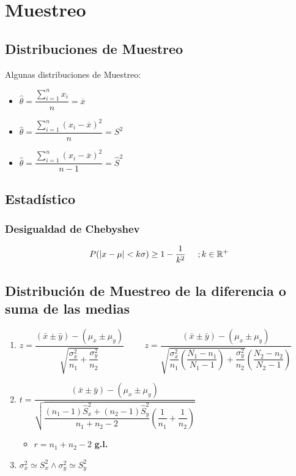 \documentclass[10pt,letterpaper]{article}
\begin{document}
\section{Muestreo}
\subsection{Distribuciones de Muestreo}
Algunas distribuciones de Muestreo:
\begin{multicols}{3}
\begin{itemize}
\item $\widehat{\theta}=\dfrac{\displaystyle\sum_{i=1}^{n} x_i}{n}=\overline{x}$
\end{itemize}
\columnbreak
\begin{itemize}
\item $\widehat{\theta}=\dfrac{\displaystyle\sum_{i=1}^{n} (x_i-\overline{x})^2}{n}=S^2$
\end{itemize}
\columnbreak
\begin{itemize}
\item $\widehat{\theta}=\dfrac{\displaystyle\sum_{i=1}^{n} (x_i-\overline{x})^2}{n-1}=\widehat{S}^2$
\end{itemize}
\end{multicols}
\subsection{Estadístico}
\subsubsection{Desigualdad de Chebyshev}
$$
P(|x-\mu|<k\sigma) \geq 1-\dfrac{1}{k^2} \hspace{0.5cm};k\in \mathbb{R^+}
$$
\subsection{Distribución de Muestreo de la diferencia o suma de las medias}
\begin{enumerate}[label=\Roman*)]
  \item $z=\dfrac{(\bar{x}\pm\bar{y})-(\mu_x\pm\mu_y)}{\sqrt{\dfrac{\sigma_{x}^2}{n_1}+\dfrac{\sigma_{y}^2}{n_2}}}\hspace{1cm}
  z=\dfrac{(\bar{x}\pm\bar{y})-(\mu_x\pm\mu_y)}{\sqrt{\dfrac{\sigma_{x}^2}{n_1}\left(\dfrac{N_1-n_1}{N_1 - 1}\right)  +\dfrac{\sigma_{y}^2}{n_2}}\left(\dfrac{N_2-n_2}{N_2 - 1}\right)}  
  $
  \item $t=\dfrac{(\bar{x}\pm\bar{y})-(\mu_x\pm\mu_y)}{\sqrt{\dfrac{(n_1-1)\hat{S}_x^2+(n_2-1)\hat{S}_y^2}{n_1 + n_2 - 2}\left( \dfrac{1}{n_1}+\dfrac{1}{n_2} \right) }}$ \\
  \begin{itemize}
  \item $r = n_1 +n_2 -2$ \textbf{g.l.}
  \end{itemize}
  \item $\sigma_x^2 \simeq S_x^2 \wedge \sigma_y^2 \simeq S_y^2$
\end{enumerate}
\end{document}
